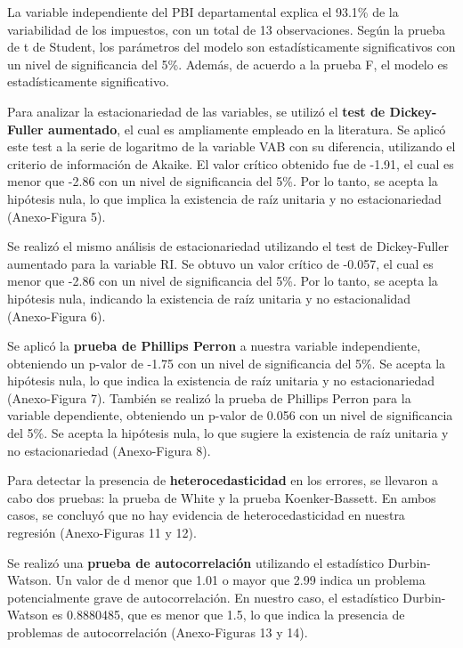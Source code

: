 \documentclass[
  letterpaper,
  DIV=11,
  numbers=noendperiod]{scrartcl}
\begin{document}
La variable independiente del PBI departamental explica el 93.1\% de la
variabilidad de los impuestos, con un total de 13 observaciones. Según
la prueba de t de Student, los parámetros del modelo son
estadísticamente significativos con un nivel de significancia del 5\%.
Además, de acuerdo a la prueba F, el modelo es estadísticamente
significativo.

Para analizar la estacionariedad de las variables, se utilizó el
\textbf{test de Dickey-Fuller aumentado}, el cual es ampliamente
empleado en la literatura. Se aplicó este test a la serie de logaritmo
de la variable VAB con su diferencia, utilizando el criterio de
información de Akaike. El valor crítico obtenido fue de -1.91, el cual
es menor que -2.86 con un nivel de significancia del 5\%. Por lo tanto,
se acepta la hipótesis nula, lo que implica la existencia de raíz
unitaria y no estacionariedad (Anexo-Figura 5).

Se realizó el mismo análisis de estacionariedad utilizando el test de
Dickey-Fuller aumentado para la variable RI. Se obtuvo un valor crítico
de -0.057, el cual es menor que -2.86 con un nivel de significancia del
5\%. Por lo tanto, se acepta la hipótesis nula, indicando la existencia
de raíz unitaria y no estacionalidad (Anexo-Figura 6).

Se aplicó la \textbf{prueba de Phillips Perron} a nuestra variable
independiente, obteniendo un p-valor de -1.75 con un nivel de
significancia del 5\%. Se acepta la hipótesis nula, lo que indica la
existencia de raíz unitaria y no estacionariedad (Anexo-Figura 7).
También se realizó la prueba de Phillips Perron para la variable
dependiente, obteniendo un p-valor de 0.056 con un nivel de
significancia del 5\%. Se acepta la hipótesis nula, lo que sugiere la
existencia de raíz unitaria y no estacionariedad (Anexo-Figura 8).

Para detectar la presencia de \textbf{heterocedasticidad} en los
errores, se llevaron a cabo dos pruebas: la prueba de White y la prueba
Koenker-Bassett. En ambos casos, se concluyó que no hay evidencia de
heterocedasticidad en nuestra regresión (Anexo-Figuras 11 y 12).

Se realizó una \textbf{prueba de autocorrelación} utilizando el
estadístico Durbin-Watson. Un valor de d menor que 1.01 o mayor que 2.99
indica un problema potencialmente grave de autocorrelación. En nuestro
caso, el estadístico Durbin-Watson es 0.8880485, que es menor que 1.5,
lo que indica la presencia de problemas de autocorrelación
(Anexo-Figuras 13 y 14).
\end{document}
